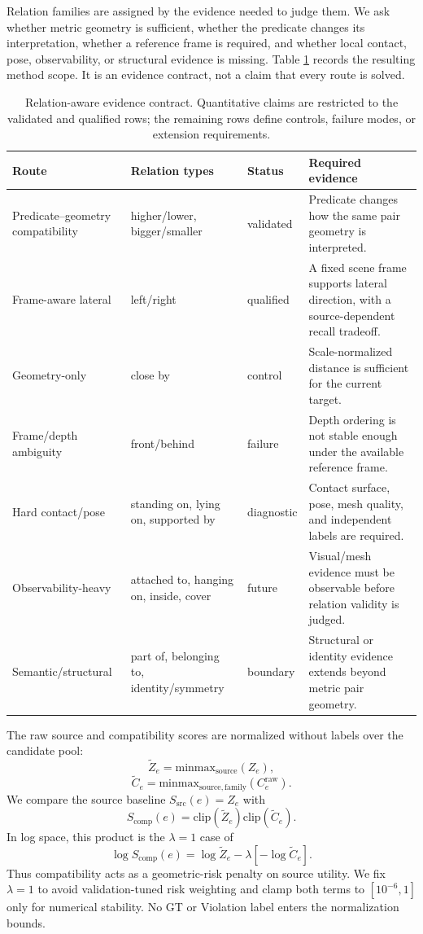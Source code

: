 \documentclass[letterpaper]{article} %
\newcommand{\Ze}{\ensuremath{Z_e}}
\newcommand{\Ssrc}{\ensuremath{S_{\mathrm{src}}}}
\newcommand{\Scomp}{\ensuremath{S_{\mathrm{comp}}}}
\begin{document}
Relation families are assigned by the evidence needed to judge them. We ask
whether metric geometry is sufficient, whether the predicate changes its
interpretation, whether a reference frame is required, and whether local
contact, pose, observability, or structural evidence is missing. Table
\ref{tab:route-taxonomy} records the resulting method scope. It is an evidence
contract, not a claim that every route is solved.

\begin{table}[t]
\centering
\small
\setlength{\tabcolsep}{4pt}
\begin{tabular}{p{}p{}p{}p{}}
\toprule
Route & Relation types & Status & Required evidence \\
\midrule
Predicate--geometry compatibility & higher/lower, bigger/smaller & validated & Predicate changes how the same pair geometry is interpreted. \\
Frame-aware lateral & left/right & qualified & A fixed scene frame supports lateral direction, with a source-dependent recall tradeoff. \\
Geometry-only & close by & control & Scale-normalized distance is sufficient for the current target. \\
Frame/depth ambiguity & front/behind & failure & Depth ordering is not stable enough under the available reference frame. \\
Hard contact/pose & standing on, lying on, supported by & diagnostic & Contact surface, pose, mesh quality, and independent labels are required. \\
Observability-heavy & attached to, hanging on, inside, cover & future & Visual/mesh evidence must be observable before relation validity is judged. \\
Semantic/structural & part of, belonging to, identity/symmetry & boundary & Structural or identity evidence extends beyond metric pair geometry. \\
\bottomrule
\end{tabular}
\caption{Relation-aware evidence contract. Quantitative claims are restricted
to the validated and qualified rows; the remaining rows define controls,
failure modes, or extension requirements.}
\label{tab:route-taxonomy}
\end{table}

The raw source and compatibility scores are normalized without labels over the
candidate pool:
\[
\widetilde Z_e=\mathrm{minmax}_{\mathrm{source}}(\Ze),
\]
\[
\widetilde C_e=\mathrm{minmax}_{\mathrm{source,family}}
(C_e^{\mathrm{raw}}).
\]
We compare the source baseline $\Ssrc(e)=\Ze$ with
\[
\Scomp(e)=\mathrm{clip}(\widetilde Z_e)
            \mathrm{clip}(\widetilde C_e).
\]
In log space, this product is the $\lambda=1$ case of
\[
\log \Scomp(e)=\log\widetilde Z_e-
\lambda[-\log\widetilde C_e].
\]
Thus compatibility acts as a geometric-risk penalty on source utility. We fix
$\lambda=1$ to avoid validation-tuned risk weighting and clamp both terms to
$[10^{-6},1]$ only for numerical stability. No GT or Violation label enters the
normalization bounds.
\end{document}
